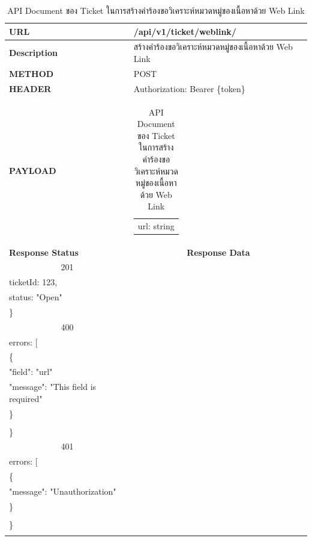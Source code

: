 \documentclass[12pt,oneside,openright,a4paper]{cpe-thai-project}
\begin{document}
\begin{longtable}[!ht]{p{3cm}|p{8cm}}
  \caption{API Document ของ Ticket ในการสร้างคำร้องขอวิเคราะห์หมวดหมู่ของเนื้อหาด้วย Web Link}\label{tbl:api_ticket_weblink} 
    \endfirsthead
    \endhead
    \hhline{==}
    \textbf{URL}              & /api/v1/ticket/weblink/                                                                                              \\ \hline
    \textbf{Description}      & สร้างคำร้องขอวิเคราะห์หมวดหมู่ของเนื้อหาด้วย Web Link                                                                                        \\ \hline
    \textbf{METHOD}           & POST                                                                                                                 \\ \hline
    \textbf{HEADER}           & Authorization: Bearer \{token\}                                                                                         \\ \hline
    \textbf{PAYLOAD}          & \begin{tabular}[c]{@{}l@{}}url: string\end{tabular}  \\ \hline \newpage \hline
    \textbf{Response Status}  & \multicolumn{1}{c}{\textbf{Response Data}}                                                                          \\ \hline
    \multicolumn{1}{c|}{201}  & \begin{tabular}[c]{@{}l@{}}\{\\ \quad ticketId: 123,\\ \quad status: "Open"\\ \}\end{tabular}                                 \\ \hline
    \multicolumn{1}{c|}{400}  &
    \begin{tabular}[c]{@{}l@{}}\{\\ \quad errors: {[}\\ \quad\quad\{\\ \quad\quad\quad "field": "url"\\ \quad\quad\quad "message": "This field is required"\\ \quad\quad \}\\ \quad{]}\\\}\end{tabular} \\ \hline
    \multicolumn{1}{c|}{401}  &
    \begin{tabular}[c]{@{}l@{}}\{\\ \quad errors: {[}\\ \quad\quad\{\\ \quad\quad\quad"message": "Unauthorization"\\ \quad\quad\}\\\quad {]}\\ \}\end{tabular}                                                                         \\ \hline
    \hhline{==}
\end{longtable}
\end{document}
